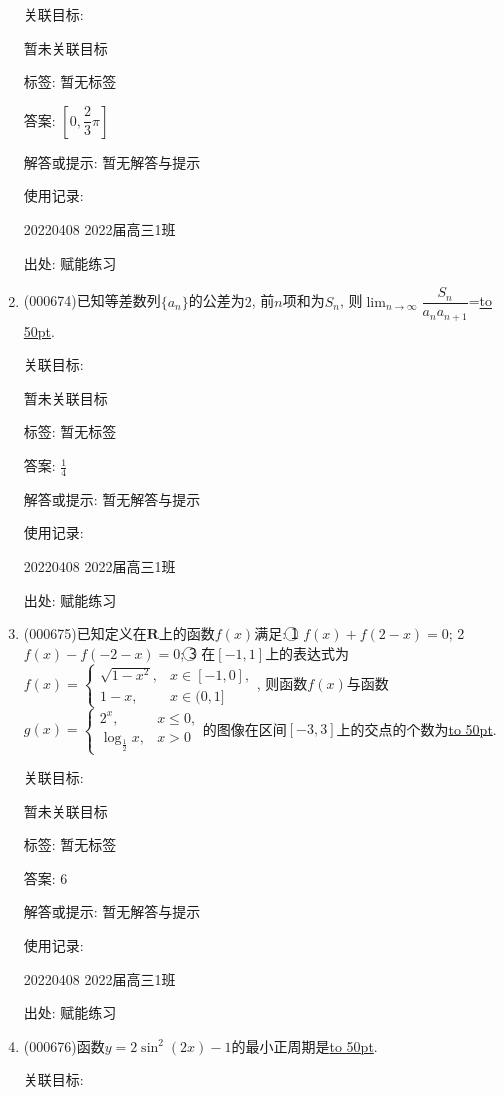 \documentclass[10pt,a4paper]{article}
\newcommand{\blank}[1]{\underline{\hbox to #1pt{}}}
\begin{document}
\begin{enumerate}[1.]
关联目标:

暂未关联目标



标签: 暂无标签

答案: $[ 0,\dfrac 23\pi]$

解答或提示: 暂无解答与提示

使用记录:

20220408	2022届高三1班	


出处: 赋能练习
\item { (000674)}已知等差数列$\{a_n\}$的公差为$2$, 前$n$项和为$S_n$, 则$\displaystyle\lim_{n\to\infty}\dfrac{S_n}{{a_n}{a_{n+1}}}$=\blank{50}.


关联目标:

暂未关联目标



标签: 暂无标签

答案: $\frac 14$

解答或提示: 暂无解答与提示

使用记录:

20220408	2022届高三1班	


出处: 赋能练习
\item { (000675)}已知定义在$\mathbf{R}$上的函数$f(x)$满足: \textcircled{1} $f(x)+f(2-x)=0$; \textcircled{2} $f(x)-f(-2-x)=0$; \textcircled{3} 在$[-1,1]$上的表达式为$f(x)=\begin{cases} \sqrt{1-x^2}, & x\in [-1,0], \\ 1-x, & x\in (0,1] \end{cases}$, 则函数$f(x)$与函数$g(x)=\begin{cases} 2^x, & x\le 0, \\ \log_{\frac12} x,& x>0 \end{cases}$的图像在区间$[-3,3]$上的交点的个数为\blank{50}.


关联目标:

暂未关联目标



标签: 暂无标签

答案: $6$

解答或提示: 暂无解答与提示

使用记录:

20220408	2022届高三1班	


出处: 赋能练习
\item { (000676)}函数$y=2\sin^2(2x)-1$的最小正周期是\blank{50}.


关联目标:


\end{enumerate}
\end{document}
